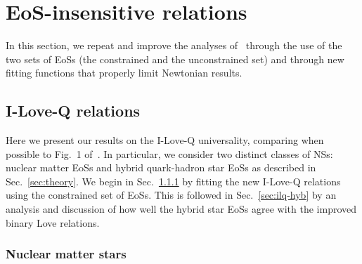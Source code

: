 \documentclass[prd,twocolumn,nofootinbib,superscriptaddress,amsmath,amssymb]{revtex4-1}
\begin{document}
\section{EoS-insensitive relations}
\label{sec:universal}

In this section, we repeat and improve the analyses of~\cite{Yagi:binLove,Yagi:ILQ} through the use of the two sets of EoSs (the constrained and the unconstrained set) and through new fitting functions that properly limit Newtonian results.   


\subsection{I-Love-Q relations}
\label{sec:ilq}

Here we present our results on the I-Love-Q universality, comparing when possible to Fig.~1 of~\cite{Yagi:ILQ}.
In particular, we consider two distinct classes of NSs: nuclear matter EoSs and hybrid quark-hadron star EoSs as described in Sec.~\ref{sec:theory}.
We begin in Sec.~\ref{sec:ilq-nuc} by fitting the new I-Love-Q relations using the constrained set of EoSs.
This is followed in Sec.~\ref{sec:ilq-hyb} by an analysis and discussion of how well the hybrid star EoSs agree with the improved binary Love relations. 

\subsubsection{Nuclear matter stars}
\label{sec:ilq-nuc}
\end{document}
